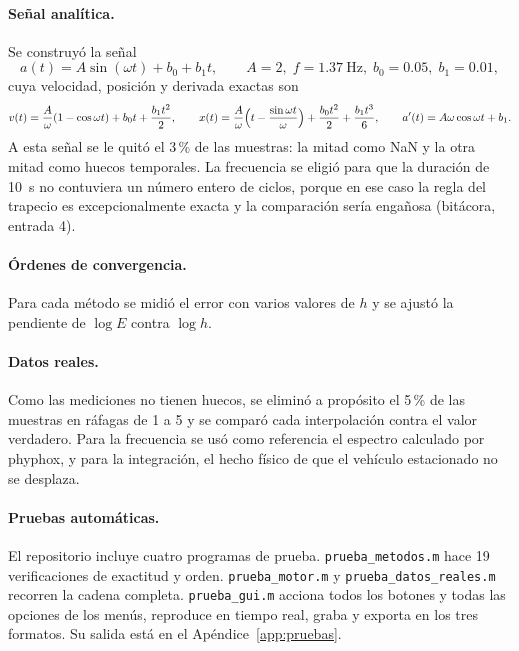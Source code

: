 \paragraph{Señal analítica.} Se construyó la señal
\begin{equation}
  a(t) = A\sin(\omega t) + b_0 + b_1 t, \qquad A = 2,\; f = 1.37~\text{Hz},\; b_0 = 0.05,\; b_1 = 0.01,
\end{equation}
cuya velocidad, posición y derivada exactas son
\begin{equation}
  v(t) = \frac{A}{\omega}(1 - \cos\omega t) + b_0 t + \frac{b_1 t^2}{2}, \qquad
  x(t) = \frac{A}{\omega}\Bigl(t - \frac{\sin\omega t}{\omega}\Bigr) + \frac{b_0 t^2}{2} + \frac{b_1 t^3}{6}, \qquad
  a'(t) = A\omega\cos\omega t + b_1 .
\end{equation}
A esta señal se le quitó el 3\,\% de las muestras: la mitad como NaN y la otra mitad como huecos temporales. La frecuencia se eligió para que la duración de 10~s no contuviera un número entero de ciclos, porque en ese caso la regla del trapecio es excepcionalmente exacta y la comparación sería engañosa (bitácora, entrada 4).

\paragraph{Órdenes de convergencia.} Para cada método se midió el error con varios valores de $h$ y se ajustó la pendiente de $\log E$ contra $\log h$.

\paragraph{Datos reales.} Como las mediciones no tienen huecos, se eliminó a propósito el 5\,\% de las muestras en ráfagas de 1 a 5 y se comparó cada interpolación contra el valor verdadero. Para la frecuencia se usó como referencia el espectro calculado por phyphox, y para la integración, el hecho físico de que el vehículo estacionado no se desplaza.

\paragraph{Pruebas automáticas.} El repositorio incluye cuatro programas de prueba. \texttt{prueba\_metodos.m} hace 19 verificaciones de exactitud y orden. \texttt{prueba\_motor.m} y \texttt{prueba\_datos\_reales.m} recorren la cadena completa. \texttt{prueba\_gui.m} acciona todos los botones y todas las opciones de los menús, reproduce en tiempo real, graba y exporta en los tres formatos. Su salida está en el Apéndice~\ref{app:pruebas}.
